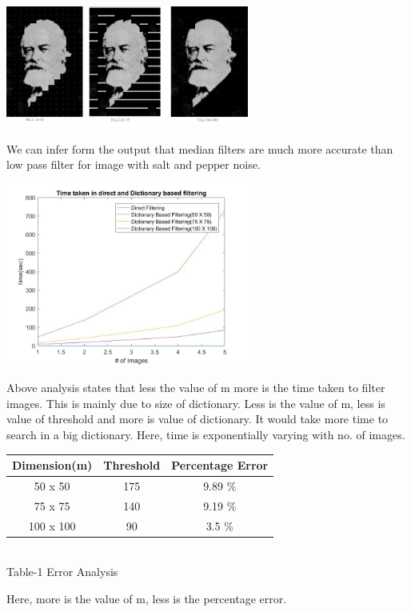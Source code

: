 \documentclass[journal]{IEEEtran}
\begin{document}
\begin{minipage}{\linewidth}
	\centering
	\includegraphics[width=80mm]{output2.jpg}
\end{minipage} 

We can infer form the output that median filters are much more accurate than low pass filter for image with salt and pepper noise.


\begin{minipage}{\linewidth}
	\centering
	\includegraphics[width=80mm]{Timeanalysis.jpg}
\end{minipage} 

Above analysis states that less the value of m more is the time taken to filter images. This is mainly due to size of dictionary. Less is the value of m, less is value of threshold and more is value of dictionary. It would take more time to search in a big dictionary. Here, time is exponentially varying with no. of images.
\vspace{0.5cm}
\begin{center}
	\begin{tabular}{||c c c ||} 
	\hline
	Dimension(m) & Threshold  & Percentage Error \\ 
	\hline\hline
	50 x 50 & 175 & 9.89 \%  \\ 
	\hline
	75 x 75 & 140 & 9.19 \% \\ 
	\hline
	100 x 100 & 90  & 3.5 \% \\ 
	
\end{tabular}\\
 \small Table-1 Error Analysis 
\end{center}
Here, more is the value of m, less is the percentage error.
\end{document}
